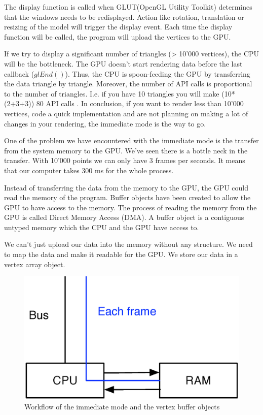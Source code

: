 The display function is called when GLUT(OpenGL Utility Toolkit) determines that the windows needs to be redisplayed. Action like rotation, translation or resizing of the model will trigger the display event. Each time the display function will be called, the program will upload the vertices to the GPU.

If we try to display a significant number of triangles (> 10'000 vertices), the CPU will be the bottleneck. The GPU doesn't start rendering data before the last callback ($glEnd()$). Thus, the CPU is spoon-feeding the GPU by transferring the data triangle by triangle. Moreover, the number of API calls is proportional to the number of triangles. I.e. if you have 10 triangles you will make (10*(2+3+3)) 80 API calls \cite{opengllegacy}. In conclusion, if you want to render less than 10'000 vertices, code a quick implementation and are not planning on making a lot of changes in your rendering, the immediate mode is the way to go.

One of the problem we have encountered with the immediate mode is the transfer from the system memory to the GPU.  We've seen there is a bottle neck in the transfer. With 10'000 points we can only have 3 frames per seconds. It means that our computer takes 300 ms for the whole process.

Instead of transferring the data from the memory to the GPU, the GPU could read the memory of the program. Buffer objects have been created to allow the GPU to have access to the memory. The process of reading the memory from the GPU is called Direct Memory Access (DMA). A buffer object is a contiguous untyped memory which the CPU and the GPU have access to.

We can't just upload our data into the memory without any structure. We need to map the data and make it readable for the GPU. We store our data in a vertex array object.


\begin{figure}[H]
  \centering
  \includegraphics[scale=0.4]{images/openglVBO.eps}
    \caption{Workflow of the immediate mode and the vertex buffer objects}
  \label{openglVBO}
\end{figure}

